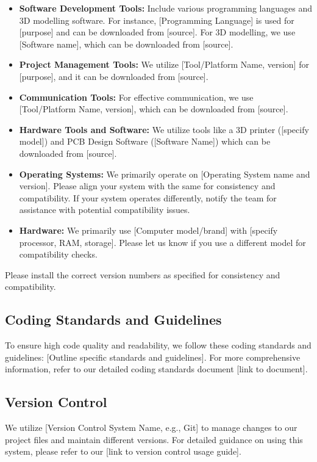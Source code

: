 \documentclass[10pt]{projectdoc}
\begin{document}
\begin{itemize}
\item \textbf{Software Development Tools:} Include various programming languages and 3D modelling software. For instance, [Programming Language] is used for [purpose] and can be downloaded from [source]. For 3D modelling, we use [Software name], which can be downloaded from [source].
\item \textbf{Project Management Tools:} We utilize [Tool/Platform Name, version] for [purpose], and it can be downloaded from [source].
\item \textbf{Communication Tools:} For effective communication, we use [Tool/Platform Name, version], which can be downloaded from [source].
\item \textbf{Hardware Tools and Software:} We utilize tools like a 3D printer ([specify model]) and PCB Design Software ([Software Name]) which can be downloaded from [source].
\item \textbf{Operating Systems:} We primarily operate on [Operating System name and version]. Please align your system with the same for consistency and compatibility. If your system operates differently, notify the team for assistance with potential compatibility issues.
\item \textbf{Hardware:} We primarily use [Computer model/brand] with [specify processor, RAM, storage]. Please let us know if you use a different model for compatibility checks.
\end{itemize}

Please install the correct version numbers as specified for consistency and compatibility.

\subsection{Coding Standards and Guidelines}

To ensure high code quality and readability, we follow these coding standards and guidelines: [Outline specific standards and guidelines]. For more comprehensive information, refer to our detailed coding standards document [link to document].

\subsection{Version Control}

We utilize [Version Control System Name, e.g., Git] to manage changes to our project files and maintain different versions. For detailed guidance on using this system, please refer to our [link to version control usage guide].
\end{document}
